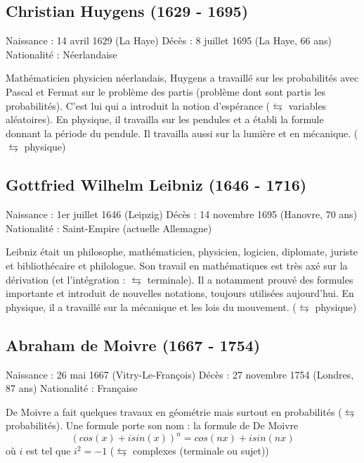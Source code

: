 \subsection*{Christian Huygens (1629 - 1695)}
Naissance : 14 avril 1629 (La Haye)\newline
Décès : 8 juillet 1695 (La Haye, 66 ans)\newline
Nationalité : Néerlandaise\newline


Mathématicien physicien néerlandais, Huygens a travaillé sur les probabilités avec Pascal et Fermat sur le problème des partis (problème dont sont partis les probabilités). C'est lui qui a introduit la notion d'espérance ($\leftrightarrows$ variables aléatoires). En physique, il travailla sur les pendules et a établi la formule donnant la période du pendule. Il travailla aussi sur la lumière et en mécanique. ($\leftrightarrows$ physique)

\subsection*{Gottfried Wilhelm Leibniz (1646 - 1716)}
Naissance : 1er juillet 1646 (Leipzig)\newline
Décès : 14 novembre 1695 (Hanovre, 70 ans)\newline
Nationalité : Saint-Empire (actuelle Allemagne)\newline


Leibniz était un philosophe, mathématicien, physicien, logicien, diplomate, juriste et bibliothécaire et philologue. Son travail en mathématiques est très axé sur la dérivation (et l'intégration : $\leftrightarrows$ terminale). Il a notamment prouvé des formules importante et introduit de nouvelles notations, toujours utilisées aujourd'hui. En physique, il a travaillé sur la mécanique et les lois du mouvement. ($\leftrightarrows$ physique)

\subsection*{Abraham de Moivre (1667 - 1754)}
Naissance : 26 mai 1667 (Vitry-Le-François)\newline
Décès : 27 novembre 1754 (Londres, 87 ans)\newline
Nationalité : Française\newline


De Moivre a fait quelques travaux en géométrie mais surtout en probabilités ($\leftrightarrows$ probabilités). Une formule porte son nom : la formule de De Moivre $$(cos(x) + i sin(x))^n = cos(nx) + i sin(nx)$$
où $i$ est tel que $i^2=-1$ ($\leftrightarrows$ complexes (terminale ou sujet))

